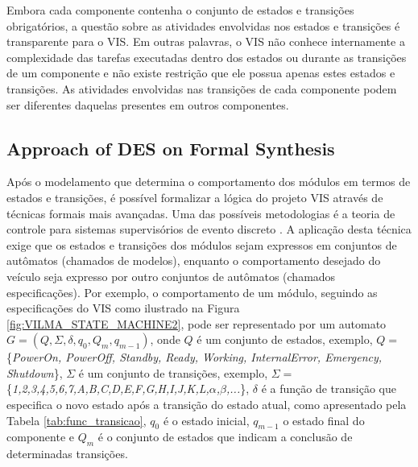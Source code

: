 \documentclass[conference]{IEEEtran}
\begin{document}
Embora cada componente contenha o conjunto de estados e transições obrigatórios, a questão sobre as atividades envolvidas nos estados e transições é transparente para o VIS. Em outras palavras, o VIS não conhece internamente a complexidade das tarefas executadas dentro dos estados ou durante as transições de um componente e não existe restrição que ele possua apenas estes estados e transições. As atividades envolvidas nas transições de cada componente podem ser diferentes daquelas presentes em outros componentes.

%
\subsection{Approach of DES on Formal Synthesis }\label{subsec:formal_synthesis}

Após o modelamento que determina o comportamento dos módulos em termos de estados e transições, é possível formalizar a lógica do projeto VIS através de técnicas formais mais avançadas. 
Uma das possíveis metodologias é a teoria de controle para sistemas supervisórios de evento discreto \cite{event_systems}. 
A aplicação desta técnica exige que os estados e transições dos módulos sejam expressos em conjuntos de autômatos (chamados de modelos), enquanto o comportamento desejado do veículo seja expresso por outro conjuntos de autômatos (chamados especificações). 
Por exemplo, o comportamento de um módulo, seguindo as especificações do VIS como ilustrado na Figura \ref{fig:VILMA_STATE_MACHINE2}, pode ser representado por um automato $G = (Q,\Sigma,\delta,q_{0},Q_{m},q_{m-1})$, onde $Q$ é um conjunto de estados, exemplo, $Q =$ \{\textit{PowerOn, PowerOff, Standby, Ready, Working, InternalError, Emergency, Shutdown}\}, $\Sigma$ é um conjunto de transições, exemplo, $\Sigma =$ \{\textit{1,2,3,4,5,6,7,A,B,C,D,E,F,G,H,I,J,K,L,$\alpha$,$\beta$,...}\}, $\delta$ é a função de transição que especifica o novo estado após a transição do estado atual, como apresentado pela Tabela \ref{tab:func_transicao}, $q_{0}$ é o estado inicial, $q_{m-1}$ o estado final do componente e $Q_{m}$ é o conjunto de estados que indicam a conclusão de determinadas transições.
\end{document}
